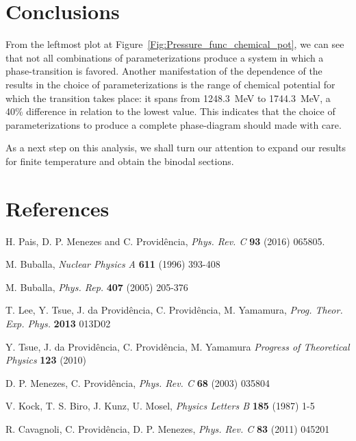 \documentclass{ws-ijmpcs}
\begin{document}
\section{Conclusions}

From the leftmost plot at Figure~\ref{Fig:Pressure_func_chemical_pot}, we can see that not all combinations of parameterizations produce a system in which a phase-transition is favored. Another manifestation of the dependence of the results in the choice of parameterizations is the range of chemical potential for which the transition takes place: it spans from 1248.3~MeV to 1744.3~MeV, a 40\% difference in relation to the lowest value. This indicates that the choice of parameterizations to produce a complete phase-diagram should made with care.

As a next step on this analysis, we shall turn our attention to expand our results for finite temperature and obtain the binodal sections.

\section{References}

\begin{thebibliography}{00}    %

 H. Pais, D. P. Menezes and C. Providência, {\it Phys. Rev. C} {\bf 93} (2016) 065805.

 M. Buballa, {\it Nuclear Physics A} {\bf 611} (1996) 393-408

 M. Buballa, {\it Phys. Rep.} {\bf 407} (2005) 205-376

 T. Lee, Y. Tsue, J. da Provid{\^e}ncia, C. Provid{\^e}ncia, M. Yamamura, {\it Prog. Theor. Exp. Phys.} {\bf 2013} 013D02

 Y. Tsue, J. da Provid{\^e}ncia, C. Provid{\^e}ncia, M. Yamamura {\it Progress of Theoretical Physics} {\bf 123} (2010)

 D. P. Menezes, C. Providência, {\it Phys. Rev. C} {\bf 68} (2003) 035804

 V. Kock, T. S. Biro, J. Kunz, U. Mosel, {\it Physics Letters B} {\bf 185} (1987) 1-5

 R. Cavagnoli, C. Providência, D. P. Menezes, {\it Phys. Rev. C} {\bf 83} (2011) 045201

\end{thebibliography}
\end{document}
